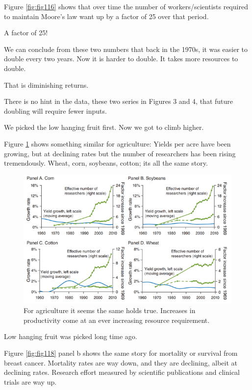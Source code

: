 \documentclass[
]{book}
\begin{document}
Figure \ref{fig:fig116} shows that over time the number of workers/scientists required to maintain Moore's law want up by a factor of 25 over that period.

A factor of 25!

We can conclude from these two numbers that back in the 1970s, it was easier to double every two years. Now it is harder to double. It takes more resources to double.

That is diminishing returns.

There is no hint in the data, these two series in Figures 3 and 4, that future doubling will require fewer inputs.

We picked the low hanging fruit first. Now we got to climb higher.

Figure \ref{fig:fig117} shows something similar for agriculture: Yields per acre have been growing, but at declining rates but the number of researchers has been rising tremendously. Wheat, corn, soybeans, cotton; its all the same story.

\begin{figure}

{\centering \includegraphics[width=1\linewidth]{img/ch1/moore17} 

}

\caption{For agriculture it seems the same holds true. Increases in productivity come at an ever increasing resource requirement.}\label{fig:fig117}
\end{figure}

Low hanging fruit was picked long time ago.

Figure \ref{fig:fig118} panel b shows the same story for mortality or survival from breast cancer. Mortality rates are way down, and they are declining, albeit at declining rates. Research effort measured by scientific publications and clinical trials are way up.
\end{document}
